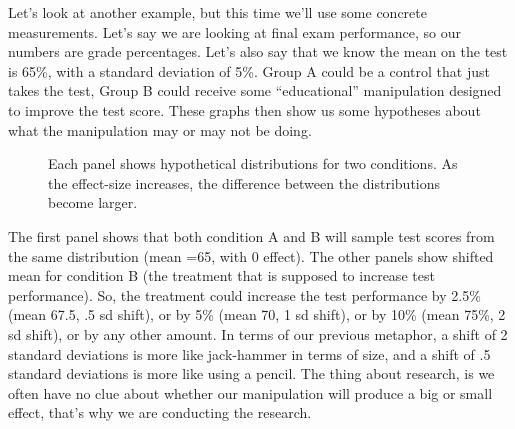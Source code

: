 \documentclass[
  letterpaper,
  DIV=11,
  numbers=noendperiod]{scrreprt}
\begin{document}
Let's look at another example, but this time we'll use some concrete
measurements. Let's say we are looking at final exam performance, so our
numbers are grade percentages. Let's also say that we know the mean on
the test is 65\%, with a standard deviation of 5\%. Group A could be a
control that just takes the test, Group B could receive some
``educational'' manipulation designed to improve the test score. These
graphs then show us some hypotheses about what the manipulation may or
may not be doing.

\begin{figure}


\caption{\label{fig-13effectdistsB}Each panel shows hypothetical
distributions for two conditions. As the effect-size increases, the
difference between the distributions become larger.}

\end{figure}%

The first panel shows that both condition A and B will sample test
scores from the same distribution (mean =65, with 0 effect). The other
panels show shifted mean for condition B (the treatment that is supposed
to increase test performance). So, the treatment could increase the test
performance by 2.5\% (mean 67.5, .5 sd shift), or by 5\% (mean 70, 1 sd
shift), or by 10\% (mean 75\%, 2 sd shift), or by any other amount. In
terms of our previous metaphor, a shift of 2 standard deviations is more
like jack-hammer in terms of size, and a shift of .5 standard deviations
is more like using a pencil. The thing about research, is we often have
no clue about whether our manipulation will produce a big or small
effect, that's why we are conducting the research.
\end{document}
